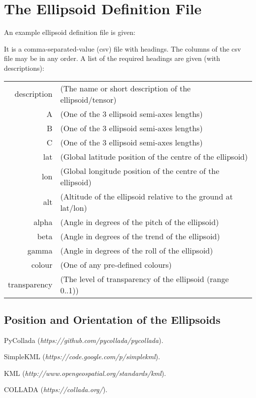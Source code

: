 \documentclass[11pt]{article}
\begin{document}
\section{The Ellipsoid Definition File}
An example ellipsoid definition file is given:

It is a comma-separated-value (csv) file with headings. The columns of the csv file may be in any order. A list of the required headings are given (with descriptions):
\begin{table}[h]
\begin{tabular}{rl}
 description & (The name or short description of the ellipsoid/tensor)  \\
 A           & (One of the 3 ellipsoid semi-axes lengths)  \\
 B           & (One of the 3 ellipsoid semi-axes lengths)  \\
 C           & (One of the 3 ellipsoid semi-axes lengths)  \\
 lat         & (Global latitude position of the centre of the ellipsoid)  \\
 lon         & (Global longitude position of the centre of the ellipsoid) \\
 alt         & (Altitude of the ellipsoid relative to the ground at lat/lon)  \\
 alpha       & (Angle in degrees of the pitch of the ellipsoid)  \\
 beta        & (Angle in degrees of the trend of the ellipsoid)  \\
 gamma       & (Angle in degrees of the roll of the ellipsoid)  \\
 colour      & (One of any pre-defined colours)  \\
 transparency& (The level of transparency of the ellipsoid (range 0..1))
\end{tabular}
\end{table}

\subsection{Position and Orientation of the Ellipsoids}






\begin{thebibliography}{1}

   PyCollada ({\em https://github.com/pycollada/pycollada}).

   SimpleKML ({\em https://code.google.com/p/simplekml}).
  
   KML ({\em http://www.opengeospatial.org/standards/kml}).
  
   COLLADA ({\em https://collada.org/}).

\end{thebibliography}
\end{document}
